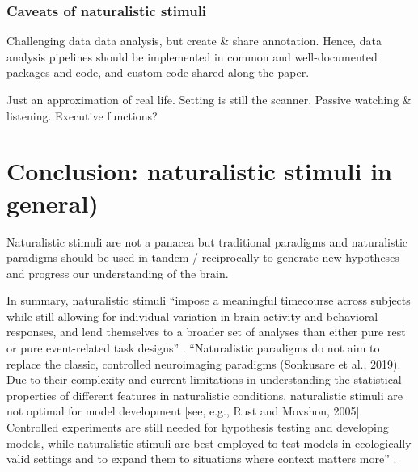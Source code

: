 \subsubsection{Caveats of naturalistic stimuli}
%
Challenging data data analysis, but create \& share annotation.
%
Hence, data analysis pipelines should be implemented in common and
well-documented packages and code, and custom code shared along the paper.

%
Just an approximation of real life.
%
Setting is still the scanner.
%
Passive watching \& listening.
%
Executive functions?


\section{Conclusion: naturalistic stimuli in general)}
%
Naturalistic stimuli are not a panacea but traditional paradigms and
naturalistic paradigms should be used in tandem / reciprocally to generate new
hypotheses and progress our understanding of the brain.


%
In summary, naturalistic stimuli ``impose a meaningful timecourse across
subjects while still allowing for individual variation in brain activity and
behavioral responses, and lend themselves to a broader set of analyses than
either pure rest or pure event-related task designs'' \citep{finn2017can}.
%
``Naturalistic paradigms do not aim to replace the classic, controlled
neuroimaging paradigms (Sonkusare et al., 2019). Due to their complexity and
current limitations in understanding the statistical properties of different
features in naturalistic conditions, naturalistic stimuli are not optimal for
model development [see, e.g., Rust and Movshon, 2005]. Controlled experiments
are still needed for hypothesis testing and developing models, while
naturalistic stimuli are best employed to test models in ecologically valid
settings and to expand them to situations where context matters
more'' \citep{saarimaki2021naturalistic}.
